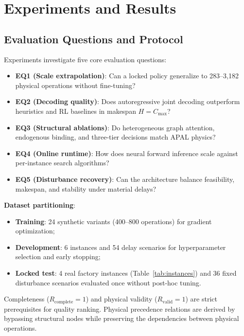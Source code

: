 \documentclass[journal,10pt]{IEEEtran}
\begin{document}
\section{Experiments and Results}\label{sec:experiments}

\subsection{Evaluation Questions and Protocol}

Experiments investigate five core evaluation questions:
\begin{itemize}
\item \textbf{EQ1 (Scale extrapolation)}: Can a locked policy generalize to 283--3,182 physical operations without fine-tuning?
\item \textbf{EQ2 (Decoding quality)}: Does autoregressive joint decoding outperform heuristics and RL baselines in makespan $H=C_{\max}$?
\item \textbf{EQ3 (Structural ablations)}: Do heterogeneous graph attention, endogenous binding, and three-tier decisions match APAL physics?
\item \textbf{EQ4 (Online runtime)}: How does neural forward inference scale against per-instance search algorithms?
\item \textbf{EQ5 (Disturbance recovery)}: Can the architecture balance feasibility, makespan, and stability under material delays?
\end{itemize}

\textbf{Dataset partitioning}:
\begin{itemize}
\item \textbf{Training}: 24 synthetic variants (400--800 operations) for gradient optimization;
\item \textbf{Development}: 6 instances and 54 delay scenarios for hyperparameter selection and early stopping;
\item \textbf{Locked test}: 4 real factory instances (Table~\ref{tab:instances}) and 36 fixed disturbance scenarios evaluated once without post-hoc tuning.
\end{itemize}
Completeness ($R_{\mathrm{complete}}=1$) and physical validity ($R_{\mathrm{valid}}=1$) are strict prerequisites for quality ranking. Physical precedence relations are derived by bypassing structural nodes while preserving the dependencies between physical operations.
\end{document}
